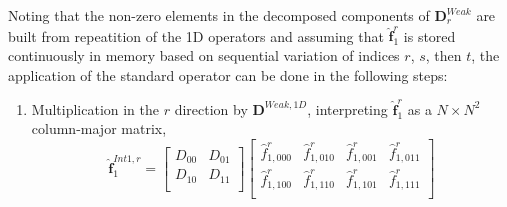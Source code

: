 \documentclass[12pt,Bold,letterpaper,TexShade]{mcgilletdclass}
\numberwithin{equation}{section}
\begin{document}
Noting that the non-zero elements in the decomposed components of $\boldsymbol D^{Weak}_r$ are built from repeatition of the 1D operators and assuming that $\hat{\boldsymbol f}^r_{1}$ is stored continuously in memory based on sequential variation of indices $r$, $s$, then $t$, the application of the standard operator can be done in the following steps:

\begin{enumerate}
\item Multiplication in the $r$ direction by $\boldsymbol D^{Weak,1D}$, interpreting $\hat{\boldsymbol f}^{r}_{1}$ as a $N \times N^2$ column-major matrix,
\begin{equation} \nonumber
\hat{\boldsymbol f}^{Int1,r}_{1}
=
\begin{bmatrix}
D_{00} & D_{01} \\
D_{10} & D_{11} \\
\end{bmatrix}
\begin{bmatrix}
\hat{f}^r_{1,000} & \hat{f}^r_{1,010} & \hat{f}^r_{1,001} & \hat{f}^r_{1,011} \\
\hat{f}^r_{1,100} & \hat{f}^r_{1,110} & \hat{f}^r_{1,101} & \hat{f}^r_{1,111} \\
\end{bmatrix}
\end{equation}


\end{enumerate}
\end{document}
